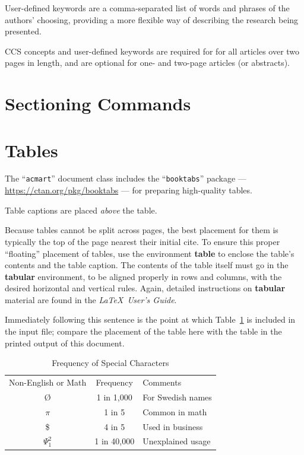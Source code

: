 \documentclass[sigplan,screen]{acmart}
\begin{document}
User-defined keywords are a comma-separated list of words and phrases
of the authors' choosing, providing a more flexible way of describing
the research being presented.

CCS concepts and user-defined keywords are required for for all
articles over two pages in length, and are optional for one- and
two-page articles (or abstracts).

\section{Sectioning Commands}



\section{Tables}

The ``\verb|acmart|'' document class includes the ``\verb|booktabs|''
package --- \url{https://ctan.org/pkg/booktabs} --- for preparing
high-quality tables.

Table captions are placed {\itshape above} the table.

Because tables cannot be split across pages, the best placement for
them is typically the top of the page nearest their initial cite.  To
ensure this proper ``floating'' placement of tables, use the
environment \textbf{table} to enclose the table's contents and the
table caption.  The contents of the table itself must go in the
\textbf{tabular} environment, to be aligned properly in rows and
columns, with the desired horizontal and vertical rules.  Again,
detailed instructions on \textbf{tabular} material are found in the
\textit{\LaTeX\ User's Guide}.

Immediately following this sentence is the point at which
Table~\ref{tab:freq} is included in the input file; compare the
placement of the table here with the table in the printed output of
this document.

\begin{table}[H]
  \caption{Frequency of Special Characters}
  \label{tab:freq}
  \begin{tabular}{ccl}
    Non-English or Math&Frequency&Comments\\
    \O & 1 in 1,000& For Swedish names\\
    $\pi$ & 1 in 5& Common in math\\
    \$ & 4 in 5 & Used in business\\
    $\Psi^2_1$ & 1 in 40,000& Unexplained usage\\
\end{tabular}
\end{table}
\end{document}
